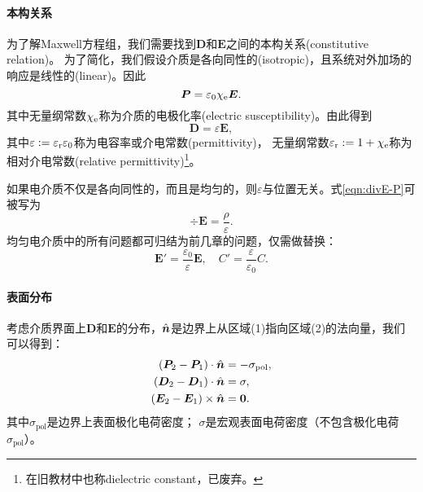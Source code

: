 \paragraph{本构关系}

为了解Maxwell方程组，我们需要找到$\bm D$和$\bm E$之间的本构关系(constitutive relation)。
为了简化，我们假设介质是各向同性的(isotropic)，且系统对外加场的响应是线性的(linear)。因此
\begin{equation}
    \bm P=\varepsilon_0\chi_\mathrm e\bm E.
\end{equation}
其中无量纲常数$\chi_\mathrm e$称为介质的电极化率(electric susceptibility)。由此得到 
\begin{equation}
    \bm D=\varepsilon\bm E,
\end{equation}
其中$\varepsilon:=\varepsilon_\text r\varepsilon_0$称为电容率或介电常数(permittivity)，
无量纲常数$\varepsilon_\text r:=1+\chi_\mathrm e$称为相对介电常数(relative permittivity)\footnote{在旧教材中也称dielectric constant，已废弃。}。

如果电介质不仅是各向同性的，而且是均匀的，则$\varepsilon$与位置无关。式\eqref{eqn:divE-P}可被写为 
\begin{equation}
    \div\bm E=\frac\rho\varepsilon.
\end{equation}
均匀电介质中的所有问题都可归结为前几章的问题，仅需做替换：
\begin{equation}
    \bm E'=\frac{\varepsilon_0}\varepsilon\bm E,\quad C'=\frac\varepsilon{\varepsilon_0}C.
\end{equation}
\paragraph{表面分布}
考虑介质界面上$\bm D$和$\bm E$的分布，$\mathop{}\!\hat{\bm{n}}$是边界上从区域(1)指向区域(2)的法向量，我们可以得到：
\begin{subequations}
    \begin{align}
        \label{eqn:Pn2-Pn1}
        (\bm P_2-\bm P_1)\cdot\mathop{}\!\hat{\bm{n}}&=-\sigma_\text{pol},\\
        \label{eqn:Dn2-Dn1}
        (\bm D_2-\bm D_1)\cdot\mathop{}\!\hat{\bm{n}}&=\sigma,\\
        \label{eqn:Et2-Et1}
        (\bm E_2-\bm E_1)\times\mathop{}\!\hat{\bm{n}}&=\bm 0.
    \end{align}
\end{subequations}
其中$\sigma_\text{pol}$是边界上表面极化电荷密度；
$\sigma$是宏观表面电荷密度（不包含极化电荷$\sigma_\text{pol}$）。

